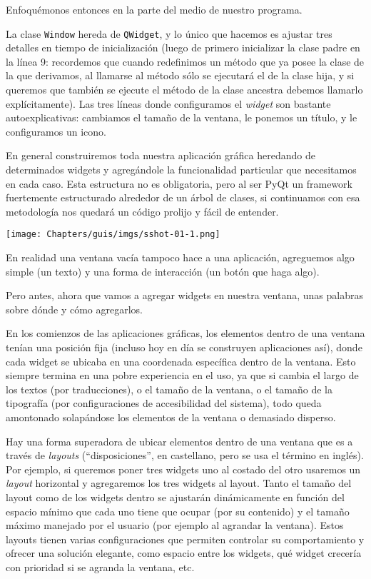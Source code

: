 Enfoquémonos entonces en la parte del medio de nuestro programa.

La clase \texttt{Window} hereda de \texttt{QWidget}, y lo único que hacemos es ajustar tres detalles en tiempo de inicialización (luego de primero inicializar la clase padre en la línea 9: recordemos que cuando redefinimos un método que ya posee la clase de la que derivamos, al llamarse al método sólo se ejecutará el de la clase hija, y si queremos que también se ejecute el método de la clase ancestra debemos llamarlo explícitamente). Las tres líneas donde configuramos el \textit{widget} son bastante autoexplicativas: cambiamos el tamaño de la ventana, le ponemos un título, y le configuramos un icono.

En general construiremos toda nuestra aplicación gráfica heredando de determinados widgets y agregándole la funcionalidad particular que necesitamos en cada caso. Esta estructura no es obligatoria, pero al ser PyQt un framework fuertemente estructurado alrededor de un árbol de clases, si continuamos con esa metodología nos quedará un código prolijo y fácil de entender.

\begin{center}
    \texttt{[image: Chapters/guis/imgs/sshot-01-1.png]}
\end{center}

En realidad una ventana vacía tampoco hace a una aplicación, agreguemos algo simple (un texto) y una forma de interacción (un botón que haga algo).

Pero antes, ahora que vamos a agregar widgets en nuestra ventana, unas palabras sobre dónde y cómo agregarlos.

En los comienzos de las aplicaciones gráficas, los elementos dentro de una ventana tenían una posición fija (incluso hoy en día se construyen aplicaciones así), donde cada widget se ubicaba en una coordenada específica dentro de la ventana. Esto siempre termina en una pobre experiencia en el uso, ya que si cambia el largo de los textos (por traducciones), o el tamaño de la ventana, o el tamaño de la tipografía (por configuraciones de accesibilidad del sistema), todo queda amontonado solapándose los elementos de la ventana o demasiado disperso.

Hay una forma superadora de ubicar elementos dentro de una ventana que es a través de \textit{layouts} (``disposiciones'', en castellano, pero se usa el término en inglés). Por ejemplo, si queremos poner tres widgets uno al costado del otro usaremos un \textit{layout} horizontal y agregaremos los tres widgets al layout. Tanto el tamaño del layout como de los widgets dentro se ajustarán dinámicamente en función del espacio mínimo que cada uno tiene que ocupar (por su contenido) y el tamaño máximo manejado por el usuario (por ejemplo al agrandar la ventana). Estos layouts tienen varias configuraciones que permiten controlar su comportamiento y ofrecer una solución elegante, como espacio entre los widgets, qué widget crecería con prioridad si se agranda la ventana, etc.

